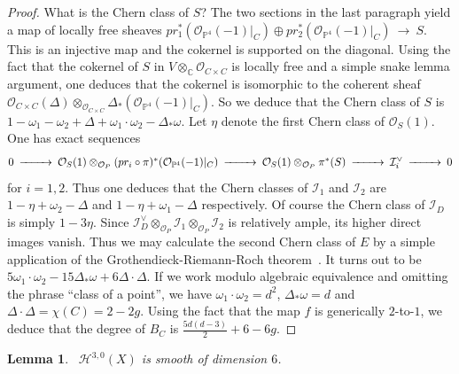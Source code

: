 \documentclass[twoside,12pt,reqno]{amsart}
\theoremstyle{plain}
\newtheorem{lem}[thm]{Lemma}
\theoremstyle{definition}
\newcommand{\Hdg}[2]{\mathcal{H}^{#1,#2}}
\newcommand{\CC}{\mathbb{C}}
\newcommand{\PP}{\mathbb{P}}
\def\ps{\vspace{4pt}}
\newcommand{\OO}{\mathcal O}
\begin{document}
\begin{proof}
What is the Chern class of $S$?  The two sections in the last
paragraph yield a map of locally free sheaves $pr_1^*(\OO_{\PP^4}(-1)|_C)\oplus
pr_2^*(\OO_{\PP^4}(-1)|_C) ~\rightarrow~ S$.  This is an injective map and the
cokernel is supported on the diagonal.  Using the fact that the
cokernel of $S$ in $V\otimes_\CC \OO_{C\times C}$ is locally free
and a simple snake lemma argument, one deduces that the cokernel
is isomorphic to the coherent sheaf $\OO_{C\times
C}(\Delta)\otimes_{\OO_{C\times C}}\Delta_*(\OO_{\PP^4}(-1)|_C)$.  So we
deduce that the Chern class of $S$ is $1-\omega_1-\omega_2+\Delta
+\omega_1\cdot\omega_2-\Delta_*\omega$.  Let $\eta$ denote the first
Chern class of $\OO_S(1)$.  One has exact sequences
\begin{equation}
\begin{CD}
0@>>>\OO_S(1)\otimes_{\OO_P}(pr_i\circ \pi)^*(\OO_{\PP^4}(-1)|_C) @>>>
	\OO_S(1)\otimes_{\OO_P}\pi^*(S) @>>> \mathcal{I}_i^\vee @>>> 0
\end{CD}
\end{equation}
for $i=1,2$.  Thus one deduces that the Chern classes of $\mathcal{I}_1$ and $\mathcal{I}_2$
are $1-\eta+\omega_2-\Delta$ and $1-\eta+\omega_1-\Delta$ respectively.
Of course the Chern class of $\mathcal{I}_D$ is simply $1-3\eta$.  Since $\mathcal{I}_D^\vee
\otimes_{\OO_P} \mathcal{I}_1\otimes_{\OO_P} \mathcal{I}_2$ is relatively ample, its higher
direct images vanish.  Thus we may calculate the second Chern class of $E$
by a simple application of the Grothendieck-Riemann-Roch theorem~\cite{F}. 
It turns out
to be $5\omega_1\cdot\omega_2-15\Delta_*\omega+6\Delta\cdot\Delta$.  If we 
work modulo algebraic equivalence and omitting the phrase ``class of a point'',
we have $\omega_1\cdot\omega_2=d^2$, $\Delta_*\omega=d$ and $\Delta\cdot\Delta
=\chi(C)=2-2g$.  Using the fact that the map $f$ is generically $2$-to-$1$,
we deduce that the degree of $B_C$ is $\frac{5d(d-3)}{2}+6-6g$.
\end{proof}

\ps

\begin{lem}~\label{lem-30}  
$\Hdg{3}{0}(X)$ is smooth of dimension $6$.
\end{lem}
\end{document}
